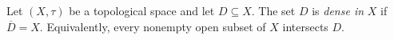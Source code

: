 \begin{definition}
\label{def:dense-subset}
Let $(X,\tau)$ be a topological space and let $D\subseteq X$.  The set
$D$ is \emph{dense in} $X$ if $\overline{D}=X$.  Equivalently, every
nonempty open subset of $X$ intersects $D$.
\end{definition}